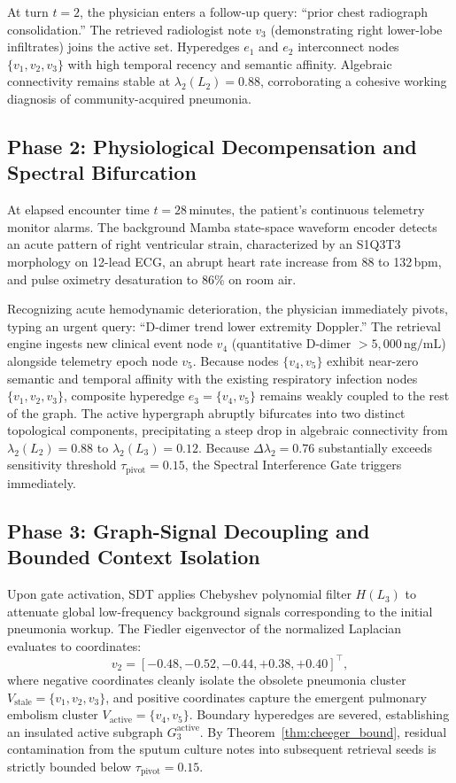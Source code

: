 \documentclass[10pt, onecolumn]{article}
\begin{document}
At turn $t=2$, the physician enters a follow-up query: ``prior chest radiograph consolidation.'' The retrieved radiologist note $v_3$ (demonstrating right lower-lobe infiltrates) joins the active set. Hyperedges $e_1$ and $e_2$ interconnect nodes $\{v_1, v_2, v_3\}$ with high temporal recency and semantic affinity. Algebraic connectivity remains stable at $\lambda_2(L_2) = 0.88$, corroborating a cohesive working diagnosis of community-acquired pneumonia.

\subsection{Phase 2: Physiological Decompensation and Spectral Bifurcation}
At elapsed encounter time $t = 28$\,minutes, the patient's continuous telemetry monitor alarms. The background Mamba state-space waveform encoder detects an acute pattern of right ventricular strain, characterized by an S1Q3T3 morphology on 12-lead ECG, an abrupt heart rate increase from 88 to 132\,bpm, and pulse oximetry desaturation to 86\% on room air. 

Recognizing acute hemodynamic deterioration, the physician immediately pivots, typing an urgent query: ``D-dimer trend lower extremity Doppler.'' The retrieval engine ingests new clinical event node $v_4$ (quantitative D-dimer $> 5{,}000\,\text{ng/mL}$) alongside telemetry epoch node $v_5$. Because nodes $\{v_4, v_5\}$ exhibit near-zero semantic and temporal affinity with the existing respiratory infection nodes $\{v_1, v_2, v_3\}$, composite hyperedge $e_3 = \{v_4, v_5\}$ remains weakly coupled to the rest of the graph. The active hypergraph abruptly bifurcates into two distinct topological components, precipitating a steep drop in algebraic connectivity from $\lambda_2(L_2) = 0.88$ to $\lambda_2(L_3) = 0.12$. Because $\Delta \lambda_2 = 0.76$ substantially exceeds sensitivity threshold $\tau_{\text{pivot}} = 0.15$, the Spectral Interference Gate triggers immediately.

\subsection{Phase 3: Graph-Signal Decoupling and Bounded Context Isolation}
Upon gate activation, SDT applies Chebyshev polynomial filter $H(L_3)$ to attenuate global low-frequency background signals corresponding to the initial pneumonia workup. The Fiedler eigenvector of the normalized Laplacian evaluates to coordinates:
\begin{equation}
  v_2 = [-0.48, -0.52, -0.44, +0.38, +0.40]^\top,
\end{equation}
where negative coordinates cleanly isolate the obsolete pneumonia cluster $V_{\text{stale}} = \{v_1, v_2, v_3\}$, and positive coordinates capture the emergent pulmonary embolism cluster $V_{\text{active}} = \{v_4, v_5\}$. Boundary hyperedges are severed, establishing an insulated active subgraph $G_3^{\text{active}}$. By Theorem~\ref{thm:cheeger_bound}, residual contamination from the sputum culture notes into subsequent retrieval seeds is strictly bounded below $\tau_{\text{pivot}} = 0.15$.
\end{document}
